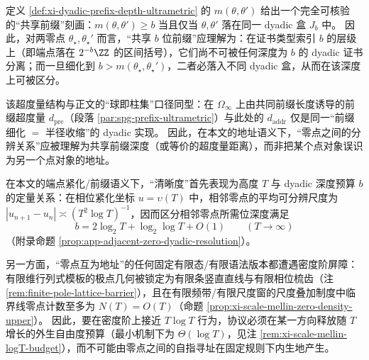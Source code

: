 \begin{remark}[共享前缀与证书细化深度]\label{rem:xi-shared-prefix-cert-depth}
定义 \ref{def:xi-dyadic-prefix-depth-ultrametric} 的 \(m(\theta,\theta')\) 给出一个完全可核验的“共享前缀”刻画：\(m(\theta,\theta')\ge b\) 当且仅当 \(\theta,\theta'\) 落在同一 dyadic 盒 \(J_b\) 中。
因此，对两零点 \(\theta_\star,\theta_\star'\) 而言，“共享 \(b\) 位前缀”应理解为：在证书类型索引 \(b\) 的层级上（即端点落在 \(2^{-b}\ZZ\) 的区间括号），它们尚不可被任何深度为 \(b\) 的 dyadic 证书分离；而一旦细化到 \(b>m(\theta_\star,\theta_\star')\)，二者必落入不同 dyadic 盒，从而在该深度上可被区分。
\par
该超度量结构与正文的“球即柱集”口径同型：在 \(\Omega_\infty\) 上由共同前缀长度诱导的前缀超度量 \(d_{\mathrm{pre}}\)（段落 \ref{par:spg-prefix-ultrametric}）与此处的 \(d_{\mathrm{addr}}\) 仅是同一“前缀细化 \(=\) 半径收缩”的 dyadic 实现。
因此，在本文的地址语义下，“零点之间的分辨关系”应被理解为共享前缀深度（或等价的超度量距离），而非把某个点对象误识为另一个点对象的地址。
\end{remark}

\begin{remark}[分辨率标度与有限态密度屏障]\label{rem:xi-resolution-height-finite-state-barrier}
在本文的端点紧化/前缀语义下，“清晰度”首先表现为高度 \(T\) 与 dyadic 深度预算 \(b\) 的定量关系：在相位紧化坐标 \(u=\upsilon(T)\) 中，相邻零点的平均可分辨尺度为 \(|u_{n+1}-u_n|\asymp (T^{2}\log T)^{-1}\)，因而区分相邻零点所需位深度满足
\[
b=2\log_{2}T+\log_{2}\log T+O(1)
\qquad(T\to\infty)
\]
（附录命题 \ref{prop:app-adjacent-zero-dyadic-resolution}）。
\par
另一方面，“零点互为地址”的任何固定有限态/有限语法版本都遭遇密度阶屏障：有限维行列式模板的极点几何被锁定为有限条竖直直线与有限相位梳齿（注 \ref{rem:finite-pole-lattice-barrier}），且在有限频带/有限尺度窗的尺度叠加制度中临界线零点计数至多为 \(N(T)=O(T)\)（命题 \ref{prop:xi-scale-mellin-zero-density-upper}）。
因此，要在密度阶上接近 \(T\log T\) 行为，协议必须在某一方向释放随 \(T\) 增长的外生自由度预算（最小机制下为 \(\Theta(\log T)\)，见注 \ref{rem:xi-scale-mellin-logT-budget}），而不可能由零点之间的自指寻址在固定规则下内生地产生。
\end{remark}

